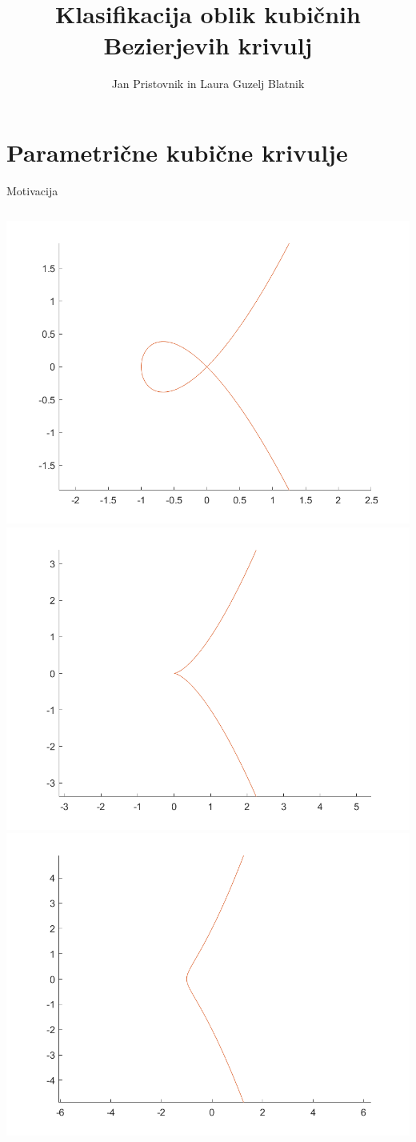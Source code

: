\documentclass{beamer} %
\title{Klasifikacija oblik kubičnih Bezierjevih krivulj}
\author{Jan Pristovnik in Laura Guzelj Blatnik}
\institute{Fakulteta za matematiko in fiziko}
\date{\displaydate{date}}
\begin{document}
 
\frame{\titlepage} %
 
\section{Parametrične kubične krivulje} 

\begin{frame}{Motivacija}
    \begin{columns}[t]
	\includegraphics[width=0.7\columnwidth]{loop.png}
	\includegraphics[width=0.7\columnwidth]{cusp.png}
	\includegraphics[width=0.7\columnwidth]{prevoj.png}

\end{columns}
\end{frame}
\end{document}
